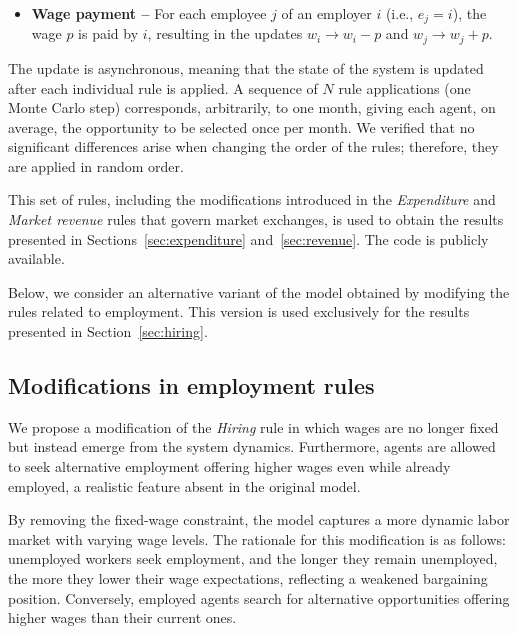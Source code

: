 \begin{itemize}
\[
n=\max\!\left(n_{i}-\frac{w_{i}}{p},\,0\right)
\]
is dismissed. The $n$ agents to be fired are selected uniformly at random from $i$’s list of employees. If all employees are dismissed, agent $i$ becomes unemployed ($e_{i}=0$).
\item \textbf{Wage payment --} For each employee $j$ of an employer $i$ (i.e., $e_{j}=i$), the wage $p$ is paid by $i$, resulting in the updates $w_{i}\to w_{i}-p$ and $w_{j}\to w_{j}+p$. 
\end{itemize}
The update is asynchronous, meaning that the state of the system is updated after each individual rule is applied. A sequence of $N$ rule applications (one Monte Carlo step) corresponds, arbitrarily, to one month, giving each agent, on average, the opportunity to be selected once per month. We verified that no significant differences arise when changing the order of the rules; therefore, they are applied in random order.

This set of rules, including the modifications introduced in the \textit{Expenditure} and \textit{Market revenue} rules that govern market exchanges, is used to obtain the results presented in Sections~\ref{sec:expenditure} and~\ref{sec:revenue}. The code is publicly available.

Below, we consider an alternative variant of the model obtained by modifying the rules related to employment. This version is used exclusively for the results presented in Section~\ref{sec:hiring}.

\subsection*{Modifications in employment rules}

\label{modifications}

We propose a modification of the \textit{Hiring} rule in which wages are no longer fixed but instead emerge from the system dynamics. Furthermore, agents are allowed to seek alternative employment offering higher wages even while already employed, a realistic feature absent in the original model.

 By removing the fixed-wage constraint, the model captures a more dynamic labor market with varying wage levels. The rationale for this modification is as follows: unemployed workers seek employment, and the longer they remain unemployed, the more they lower their wage expectations, reflecting a weakened bargaining position. Conversely, employed agents search for alternative opportunities offering higher wages than their current ones.

